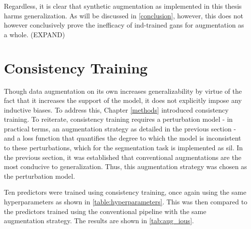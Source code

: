 Regardless, it is clear that synthetic augmentation as implemented in this thesis harms generalization. As will be discussed in \autoref{conclusion}, however, this does not however conclusively prove the inefficacy of \gls{ind}-trained \glspl{gan} for augmentation as a whole. (EXPAND) 


\section{Consistency Training}
Though data augmentation on its own increases generalizability by virtue of the fact that it increases the support of the model, it does not explicitly impose any inductive biases. To address this, Chapter \ref{methods} introduced consistency training. To reiterate, consistency training requires a perturbation model - in practical terms, an augmentation strategy as detailed in the previous section - and a loss function that quantifies the degree to which the model is inconsistent to these perturbations, which for the segmentation task is implemented as \gls{sil}. In the previous section, it was established that conventional augmentations are the most conducive to generalization. Thus, this augmentation strategy was chosen as the perturbation model. 

Ten predictors were trained using consistency training, once again using the same hyperparameters as shown in \autoref{table:hyperparameters}. This was then compared to the predictors trained using the conventional pipeline with the same augmentation strategy. The results are shown in \autoref{tab:aug_ious}. 

